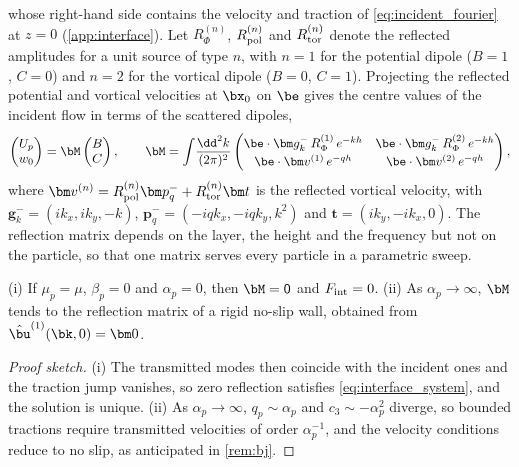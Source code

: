 whose right-hand side contains the velocity and traction of \cref{eq:incident_fourier} at $z=0$ (\cref{app:interface}).
Let $R_\Phi^{(n)}$, $R_{\rm pol}^{(n)}$ and $R_{\rm tor}^{(n)}$ denote the reflected amplitudes for a unit source of
type $n$, with $n=1$ for the potential dipole ($B=1$, $C=0$) and $n=2$ for the vortical dipole ($B=0$, $C=1$).
Projecting the reflected potential and vortical velocities at $\bx_0$ on $\be$ gives the centre values of the incident
flow in terms of the scattered dipoles,
\begin{equation}
  \begin{pmatrix}U_p\\ w_0\end{pmatrix}=\bM\begin{pmatrix}B\\ C\end{pmatrix},\qquad
  \bM=\int\!\frac{\dd^2k}{(2\pi)^2}
  \begin{pmatrix}
    \be\cdot\bm g_k^-\,R^{(1)}_\Phi\,e^{-kh} & \be\cdot\bm g_k^-\,R^{(2)}_\Phi\,e^{-kh}\\[2pt]
    \be\cdot\bm v^{(1)}\,e^{-qh} & \be\cdot\bm v^{(2)}\,e^{-qh}
  \end{pmatrix},
  \label{eq:reflection_matrix}
\end{equation}
where $\bm v^{(n)}=R^{(n)}_{\rm pol}\bm p_q^-+R^{(n)}_{\rm tor}\bm t$ is the reflected vortical velocity, with
$\bm g_k^-=(ik_x,ik_y,-k)$, $\bm p_q^-=(-iqk_x,-iqk_y,k^2)$ and $\bm t=(ik_y,-ik_x,0)$. The reflection matrix depends on
the layer, the height and the frequency but not on the particle, so that one matrix serves every particle in a
parametric sweep.

\begin{proposition}\label{prop:limits}
(i) If $\mu_p=\mu$, $\beta_p=0$ and $\alpha_p=0$, then $\bM=\mathsf 0$ and $F_{\rm int}=0$. (ii) As $\alpha_p\to\infty$,
$\bM$ tends to the reflection matrix of a rigid no-slip wall, obtained from $\hat\bu^{(1)}(\bk,0)=\bm 0$.
\end{proposition}
\begin{proof}[Proof sketch]
(i) The transmitted modes then coincide with the incident ones and the traction jump vanishes, so zero reflection
satisfies \cref{eq:interface_system}, and the solution is unique. (ii) As $\alpha_p\to\infty$, $q_p\sim\alpha_p$ and
$c_3\sim-\alpha_p^2$ diverge, so bounded tractions require transmitted velocities of order $\alpha_p^{-1}$, and the
velocity conditions reduce to no slip, as anticipated in \cref{rem:bj}.
\end{proof}


